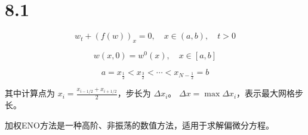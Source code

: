 \documentclass{article}
\begin{document}
\section{8.1}

\begin{equation}
w_t + (f(w))_x = 0, \quad x \in (a, b), \quad t > 0
\label{eq:8.1}
\end{equation}

\begin{equation}
w(x, 0) = w^0(x), \quad x \in [a, b]
\label{eq:8.2}
\end{equation}

\begin{equation}
a = x_{\frac{1}{2}} < x_{\frac{3}{2}} < \cdots < x_{N-\frac{1}{2}} = b
\label{eq:8.3}
\end{equation}

其中计算点为 \( x_i = \frac{x_{i-1/2} + x_{i+1/2}}{2} \)，步长为 \( \Delta x_i \)。  
\( \Delta x = \max \Delta x_i \)，表示最大网格步长。

加权ENO方法是一种高阶、非振荡的数值方法，适用于求解偏微分方程。
\end{document}
